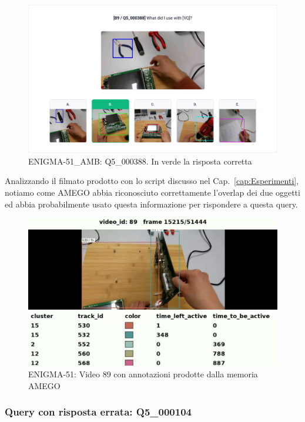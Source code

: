 \begin{figure}[h!]
    \centering
    \includegraphics[width=0.8\linewidth]{Images/amego_correct_res-ANS.png}
    \caption{
        ENIGMA-51\_AMB: Q5\_000388. In verde la risposta corretta
    }
    \label{fig:amego_correct_ans}
\end{figure}

Analizzando il filmato prodotto con lo script discusso nel Cap.~\ref{cap:Esperimenti}, notiamo come AMEGO abbia riconosciuto correttamente l'overlap dei due oggetti ed abbia probabilmente usato questa informazione per rispondere a questa query.

\begin{figure}[h!]
    \centering
    \includegraphics[width=0.8\linewidth]{Images/amego_correct_res-VIDEO.png}
    \caption{
        ENIGMA-51: Video 89 con annotazioni prodotte dalla memoria AMEGO
    }
    \label{fig:amego_correct_video}
\end{figure}


\subsubsection*{Query con risposta errata: Q5\_000104}

